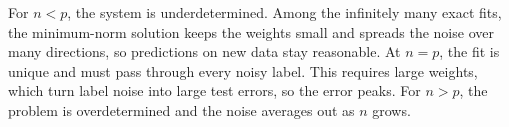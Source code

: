 For $n < p$, the
system is underdetermined. Among the infinitely many exact fits, the minimum-norm
solution keeps the weights small and spreads the noise over many directions, so
predictions on new data stay reasonable. At $n = p$, the fit is unique and must pass
through every noisy label. This requires large weights, which turn label noise into large
test errors, so the error peaks. For $n > p$, the problem is overdetermined and the noise
averages out as $n$ grows.